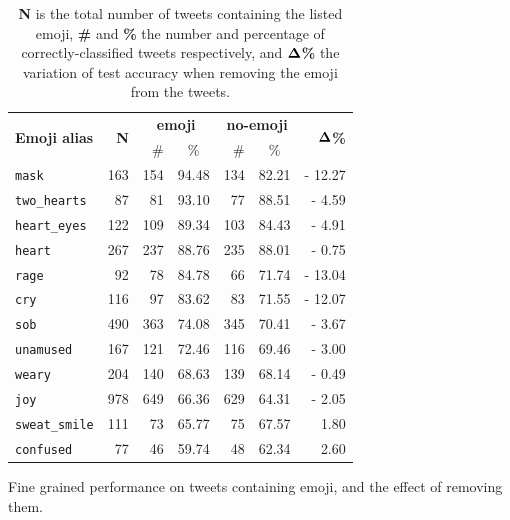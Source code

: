 \documentclass[11pt,a4paper]{article}
\begin{document}
\begin{table}[!h]
    \centering
    \scriptsize
        \begin{tabular}{lr|rc|rc|r}

           \multirow{2}{*}{\textbf{Emoji alias}} & \multirow{2}{*}{\textbf{N}} & \multicolumn{2}{c|}{\textbf{emoji}} & \multicolumn{2}{c|}{\textbf{no-emoji}} &
            \multirow{2}{*}{$\bf{\Delta}$\textbf{\%}} \\
            \cline{3-6}
                                &     & \#   & \% & \# & \% & \\
          \hline
          \hline
          \texttt{mask}         & 163 & 154 & 94.48 & 134 & 82.21 & - 12.27 \\
          \texttt{two\_hearts}  & 87  & 81  & 93.10 & 77  & 88.51 & - 4.59  \\
          \texttt{heart\_eyes}  & 122 & 109 & 89.34 & 103 & 84.43 & - 4.91  \\
          \texttt{heart}        & 267 & 237 & 88.76 & 235 & 88.01 & - 0.75  \\
          \texttt{rage}         & 92  & 78  & 84.78 & 66  & 71.74 & - 13.04 \\
          \texttt{cry}          & 116 & 97  & 83.62 & 83  & 71.55 & - 12.07 \\
          \texttt{sob}          & 490 & 363 & 74.08 & 345 & 70.41 & - 3.67  \\
          \texttt{unamused}     & 167 & 121 & 72.46 & 116 & 69.46 & - 3.00  \\
          \texttt{weary}        & 204 & 140 & 68.63 & 139 & 68.14 & - 0.49  \\
          \texttt{joy}          & 978 & 649 & 66.36 & 629 & 64.31 & - 2.05  \\
          \texttt{sweat\_smile} & 111 & 73  & 65.77 & 75  & 67.57 & 1.80 \\
          \texttt{confused}     & 77  & 46  & 59.74 & 48  & 62.34 & 2.60 \\

        \end{tabular}


    \caption{Fine grained performance on tweets containing emoji, and the effect
of removing them.} 
    \vspace{-0.4cm}
    \caption*{
        \footnotesize \textbf{N} is the total number of tweets containing the listed emoji,
        \textbf{\#} and \textbf{\%} the number and percentage of correctly-classified
        tweets respectively, and $\bf{\Delta}$\textbf{\%} the variation of test accuracy
        when removing the emoji from the tweets.}

    \label{table:emoji_fine_grained}

\end{table}
\end{document}
